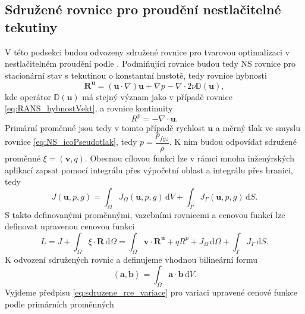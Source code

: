 \subsection{Sdružené rovnice pro proudění nestlačitelné tekutiny} \label{sec:adjoint_rce}

V této podsekci budou odvozeny sdružené rovnice pro tvarovou optimalizaci v nestlačitelném proudění podle \cite{papadimitriou2007continuous, furst2020mko2}. Podmiňující rovnice budou tedy NS rovnice pro stacionární stav s tekutinou o konstantní hustotě, tedy rovnice hybnosti
\begin{equation}\label{eq:rce_hybnosti}
\mathbf{R^u}=\left(\mathbf{u}\cdot\nabla\right)\mathbf{u} + \nabla p - \nabla \cdot 2 \nu \mathbb{D}(\mathbf{u}),
\end{equation}
kde operátor $ \mathbb{D}(\mathbf{u}) $ má stejný význam jako v případě rovnice \ref{eq:RANS_hybnostVekt}, a rovnice kontinuity
\begin{equation}
R^p=-\nabla \cdot \mathbf{u}.
\end{equation}\label{eq:rce_kontinuity}
Primární proměnné jsou tedy v tomto případě rychlost $ \mathbf{u} $ a měrný tlak ve smyslu rovnice \ref{eq:NS_icoPseudotlak}, tedy $ p = \dfrac{p_{fyz}}{\rho}$. K nim budou odpovídat sdružené proměnné $ \xi = (\mathbf{v},q) $. Obecnou cílovou funkci lze v rámci mnoha inženýrských aplikací zapsat pomocí integrálu přes výpočetní oblast a integrálu přes hranici, tedy
\begin{equation}\label{eq:cenova_fce}
J(\mathbf{u},p,g)=\int_{\Omega} J_\Omega(\mathbf{u},p,g) \, \mathrm{d}V + \int_{\Gamma}J_\Gamma(\mathbf{u},p,g) \, \mathrm{d}S.
\end{equation}
S takto definovanými proměnnými, vazebními rovnicemi a cenovou funkcí lze definovat upravenou cenovou funkci
\begin{equation}
L= J + \int_\Omega \xi \cdot \mathbf{R} \,\mathrm{d}\Omega 
= \int_\Omega \mathbf{v}\cdot\mathbf{R^u}+ q R^p +J_\Omega  \,\mathrm{d}\Omega + \int_{\Gamma}J_\Gamma \, \mathrm{d}S.
\end{equation}
K odvození sdružených rovnic a definujeme vhodnou bilineární formu 
\begin{equation}
\left\langle \mathbf{a},\mathbf{b} \right\rangle = \int_{\Omega} \mathbf{a} \cdot \mathbf{b} \, \mathrm{d}V.
\end{equation} 
Vyjdeme předpisu \ref{eq:sdruzene_rce_variace} pro variaci upravené cenové funkce podle primárních proměnných
